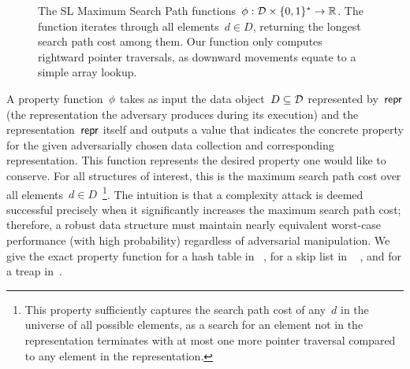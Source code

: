 \begin{figure}
            \centering
            \begin{pchstack}[boxed,center,space=0.5em]
            \end{pchstack}
      \caption[SL Maxium Search Path.]{The SL Maximum Search Path functions~$\phi : \mathcal{D} \times \{0,1 \}^{*} \rightarrow  \mathbb{R}$. The function iterates through all elements~$d \in D$, returning the longest search path cost among them. Our function only computes rightward pointer traversals, as downward movements equate to a simple array lookup. 
      } 
      \label{fig:sl-cost}
\end{figure}


A property function~$\phi$ takes as input the data object~$D \subseteq \mathcal{D}$  represented by~$\mathsf{repr}$ (the representation the adversary produces during its execution) and the representation~$\mathsf{repr}$ itself and outputs a value that indicates the concrete property for the given adversarially chosen data collection and corresponding representation. This function represents the desired property one would like to conserve. For all structures of interest, this is the maximum search path cost over all elements~$d \in D$~\footnote{This property sufficiently captures the search path cost of any~$d$ in the universe of all possible elements, as a search for an element not in the representation terminates with at most one more pointer traversal compared to any element in the representation.}. The intuition is that a complexity attack is deemed successful precisely when it significantly increases the maximum search path cost; therefore, a robust data structure must maintain nearly equivalent worst-case performance (with high probability) regardless of adversarial manipulation. We give the exact property function for a hash table in ~,  for a skip list in ~ , and for a treap in~.

